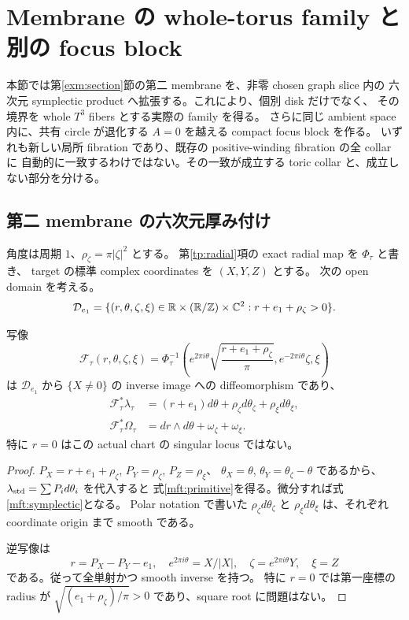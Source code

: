 \section{Membrane の whole-torus family と別の focus block}
\label{mft:section}

本節では第\ref{exm:section}節の第二 membrane を、非零 chosen graph slice 内の
六次元 symplectic product へ拡張する。これにより、個別 disk だけでなく、
その境界を whole $T^3$ fibers とする実際の family を得る。
さらに同じ ambient space 内に、共有 circle が退化する $A=0$ を越える compact focus block を作る。
いずれも新しい局所 fibration であり、既存の positive-winding fibration の全 collar に
自動的に一致するわけではない。その一致が成立する toric collar と、成立しない部分を分ける。

\subsection{第二 membrane の六次元厚み付け}

角度は周期 $1$、$\rho_\zeta=\pi|\zeta|^2$ とする。
第\ref{tp:radial}項の exact radial map を $\Phi_\tau$ と書き、
target の標準 complex coordinates を $(X,Y,Z)$ とする。
次の open domain を考える。
\[
 \mathcal D_{e_1}
 =\{(r,\theta,\zeta,\xi)\in
       \mathbb R\times(\mathbb R/\mathbb Z)\times\mathbb C^2:
       r+e_1+\rho_\zeta>0\}.
\]

\begin{proposition}\label{mft:chart}
写像
\begin{equation}\label{mft:chart-map}
 \mathcal F_\tau(r,\theta,\zeta,\xi)
 =\Phi_\tau^{-1}\left(
    e^{2\pi i\theta}\sqrt{\frac{r+e_1+\rho_\zeta}{\pi}},
    e^{-2\pi i\theta}\zeta,\xi\right)
\end{equation}
は $\mathcal D_{e_1}$ から $\{X\ne0\}$ の inverse image への diffeomorphism であり、
\begin{align}
 \mathcal F_\tau^*\lambda_\tau
  &=(r+e_1)d\theta+\rho_\zeta d\theta_\zeta
                      +\rho_\xi d\theta_\xi,
       \label{mft:primitive}\\
 \mathcal F_\tau^*\Omega_\tau
  &=dr\wedge d\theta+\omega_\zeta+\omega_\xi.
       \label{mft:symplectic}
\end{align}
特に $r=0$ はこの actual chart の singular locus ではない。
\end{proposition}

\begin{proof}
$P_X=r+e_1+\rho_\zeta$, $P_Y=\rho_\zeta$, $P_Z=\rho_\xi$、
$\theta_X=\theta$, $\theta_Y=\theta_\zeta-\theta$ であるから、
$\lambda_{\rm std}=\sum P_i d\theta_i$ を代入すると
式\eqref{mft:primitive}を得る。微分すれば式\eqref{mft:symplectic}となる。
Polar notation で書いた $\rho_\zeta d\theta_\zeta$ と
$\rho_\xi d\theta_\xi$ は、それぞれ coordinate origin まで smooth である。

逆写像は
\[
 r=P_X-P_Y-e_1,\quad
 e^{2\pi i\theta}=X/|X|,\quad
 \zeta=e^{2\pi i\theta}Y,\quad \xi=Z
\]
である。従って全単射かつ smooth inverse を持つ。
特に $r=0$ では第一座標の radius が
$\sqrt{(e_1+\rho_\zeta)/\pi}>0$ であり、square root に問題はない。
\end{proof}


